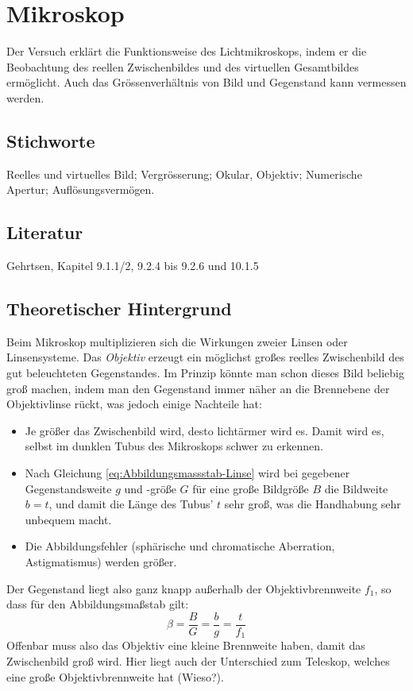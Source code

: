 \chapter{Mikroskop}
\label{v:8}

Der Versuch erklärt die Funktionsweise des Lichtmikroskops, indem er die Beobachtung des reellen Zwischenbildes und des virtuellen Gesamtbildes ermöglicht. Auch das Grössenverhältnis von Bild und Gegenstand kann vermessen werden.

\section{Stichworte}

Reelles und virtuelles Bild; Vergrösserung; Okular, Objektiv; Numerische Apertur; Auflösungsvermögen.
%
\section{Literatur}

Gehrtsen, Kapitel 9.1.1/2, 9.2.4 bis 9.2.6 und 10.1.5
%
\section{Theoretischer Hintergrund}

Beim Mikroskop multiplizieren sich die Wirkungen zweier Linsen oder Linsensysteme. Das \textit{Objektiv} erzeugt ein möglichst großes reelles Zwischenbild des gut beleuchteten Gegenstandes. Im Prinzip könnte man schon dieses Bild beliebig groß machen, indem man den Gegenstand immer näher an die Brennebene der Objektivlinse rückt, was jedoch einige Nachteile hat:
\begin{itemize}
	\item Je größer das Zwischenbild wird, desto lichtärmer wird es. Damit wird es, selbst im dunklen Tubus des Mikroskops schwer zu erkennen.
	\item Nach Gleichung \ref{eq:Abbildungsmassstab-Linse} wird bei gegebener Gegenstandsweite $g$ und -größe $G$ für eine große Bildgröße $B$ die Bildweite $b = t$, und damit die Länge des Tubus' $t$ sehr groß, was die Handhabung sehr unbequem macht.
	\item Die Abbildungsfehler (sphärische und chromatische Aberration, Astigmatismus) werden größer.
\end{itemize}
Der Gegenstand liegt also ganz knapp außerhalb der Objektivbrennweite $f_1$, so dass für den Abbildungsmaßstab gilt:
\begin{equation}
	\beta = \frac{B}{G} = \frac{b}{g} = \frac{t}{f_1}
\end{equation}
Offenbar muss also das Objektiv eine kleine Brennweite haben, damit das Zwischenbild groß wird. Hier liegt auch der Unterschied zum Teleskop, welches eine große Objektivbrennweite hat (Wieso?).

